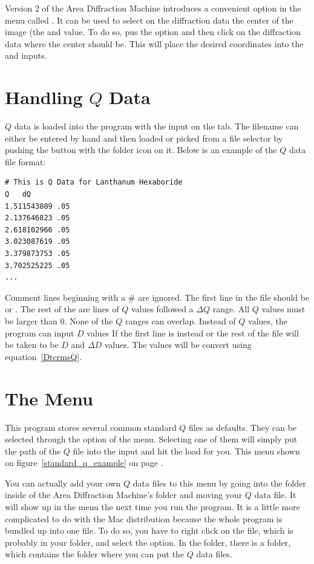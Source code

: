 Version 2 of the Area Diffraction Machine introduces a convenient
option in the  menu called .
It can be used to select on the diffraction data the center of the
image (the  and  value. To do so, pus the
 option and then click on the diffraction data
where the center should be. This will place the desired coordinates
into the  and  inputs.

\section{Handling \texorpdfstring{$Q$}{Q} Data}
\label{TheQValues}

$Q$ data is loaded into the program with the 
input on the  tab. The filename can either 
be entered by hand and then loaded or picked from a file selector 
by pushing the button with the folder icon on it.  Below is an example 
of the $Q$ data file format: 
\begin{lstlisting}
# This is Q Data for Lanthanum Hexaboride
Q   dQ
1.511543809 .05
2.137646823 .05
2.618102966 .05
3.023087619 .05
3.379873753 .05
3.702525225 .05
...
\end{lstlisting}
Comment lines beginning with a \# are ignored. The
first line in the file should be  or 
. The 
rest of the are lines of $Q$ values followed a $\Delta Q$ range.
All $Q$ values must be larger than 0. None of the $Q$ ranges can 
overlap. Instead of $Q$ values, the program can input $D$ values 
If the first line is instead  or  the rest of 
the file will be taken to be $D$ and $\Delta D$ values.
The values will be convert using equation~\ref{DtermsQ}. 

\section{\texorpdfstring{The  Menu}{The Standard Q Menu}}

This program stores several common standard $Q$ files as defaults. 
They can be selected through the  option of the 
 menu. Selecting one of them will simply put the path
of the $Q$ file into the  input and hit the load for you.
This menu shown on figure~\ref{standard_q_example} on
page \pageref{standard_q_example}. 

You can actually add your own $Q$ data files to this menu by
going into the  folder inside of the Area
Diffraction Machine's folder and moving your $Q$ data file.
It will show up in the menu the next time you run the program.
It is a little more complicated to do with the Mac distribution
because the whole program is bundled up into one  file.
To do so, you have to right click on the  file, which
is probably in your  folder, and select
the  option. In the 
folder, there is a  folder, which contains 
the  folder where you can put the $Q$ data files.

